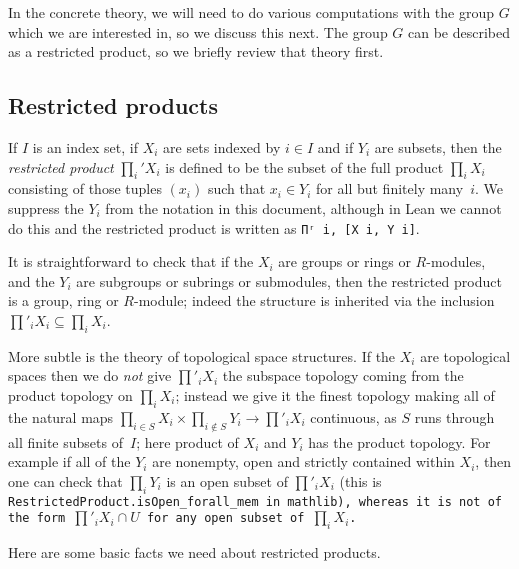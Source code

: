 In the concrete theory, we will need to do various computations with the
group $G$ which we are interested in, so we discuss this next. The group $G$
can be described as a restricted product, so we briefly review that theory
first.

\subsection{Restricted products}

If $I$ is an index set, if $X_i$ are sets indexed by $i\in I$ and if $Y_i$
are subsets, then the \emph{restricted product} $\prod_i'X_i$ is defined
to be the subset of the full product $\prod_i X_i$ consisting of those
tuples $(x_i)$ such that $x_i\in Y_i$ for all but finitely many~$i$. We suppress
the $Y_i$ from the notation in this document, although in Lean we cannot do this and
the restricted product is written as {\tt Πʳ i, [X i, Y i]}.

It is straightforward to check that if the $X_i$ are groups or rings or $R$-modules,
and the $Y_i$ are subgroups or subrings or submodules, then the restricted product
is a group, ring or $R$-module; indeed the structure is inherited via the
inclusion $\prod'_iX_i\subseteq\prod_iX_i$.

More subtle is the theory of topological space structures. If the $X_i$
are topological spaces then we do \emph{not} give $\prod'_iX_i$ the subspace
topology coming from the product topology on $\prod_iX_i$; instead we give
it the finest topology making all of the
natural maps $\prod_{i\in S}X_i\times\prod_{i\notin S}Y_i\to \prod'_iX_i$ continuous,
as $S$ runs through all finite subsets of~$I$; here product of $X_i$ and $Y_i$ has
the product topology. For example if all of the $Y_i$ are nonempty, open and strictly
contained within $X_i$, then one can check that $\prod_iY_i$ is an open subset of
$\prod'_iX_i$ (this is \tt{RestrictedProduct.isOpen\_forall\_mem} in mathlib),
whereas it is not of the form $\prod'_iX_i\cap U$ for any open subset of $\prod_iX_i$.

Here are some basic facts we need about restricted products.

